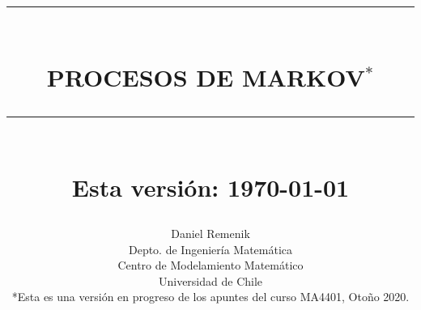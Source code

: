 
\newcommand{\HRule}[1]{\rule{\linewidth}{#1}} 	%

\makeatletter							%
\def\printtitle{%
    {\centering \@title\par}}
\makeatother									

\makeatletter							%
\def\printauthor{%
    {\centering \large \@author}}				
\makeatother							

\title{     \HRule{1pt} \\[12pt]						%
			 \textbf{\uppercase{\LARGE Procesos de Markov$^*$}}	%
			\HRule{1.5pt} \\ [0.2cm]		%
			\large Esta versión: \today
		}

\author{
		Daniel Remenik\\
		Depto. de Ingeniería Matemática\\	
		Centro de Modelamiento Matemático\\	
		Universidad de Chile\\[1.25cm]
        *{\small Esta es una versión en progreso de los apuntes del curso MA4401, Otoño 2020.}
}
